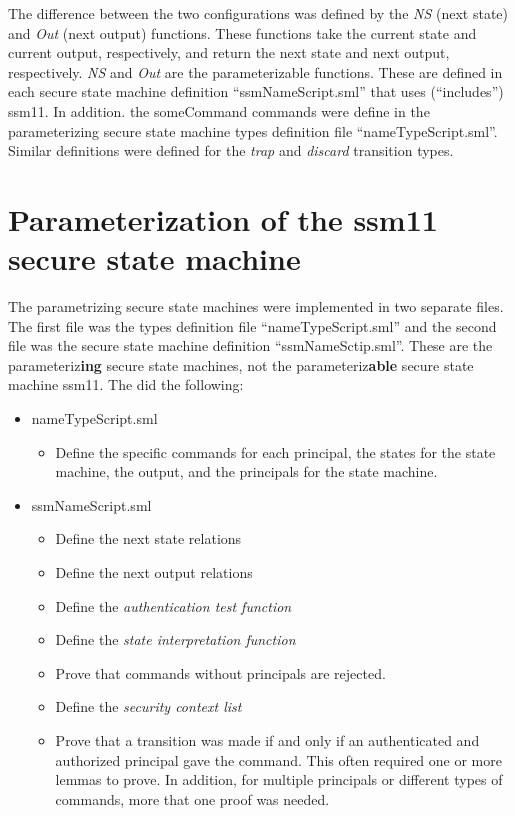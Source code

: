   The difference between the two configurations was defined by the \textit{NS} (next state) and \textit{Out} (next output)
  functions. These functions take the current state and current output, respectively, and return the
  next state and next output, respectively. \textit{NS} and \textit{Out} are the parameterizable functions. These are
  defined in each secure state machine definition “ssmNameScript.sml” that uses (“includes”) ssm11.
  In addition. the someCommand commands were define in the parameterizing secure state machine types
  definition file “nameTypeScript.sml”. Similar definitions were defined for the \textit{trap} and \textit{discard}
  transition types.
  

\section{Parameterization of the ssm11 secure state machine}
\label{sec:param-ssm11-secure}


The parametrizing secure state machines were implemented in two separate files. The first
file was the types definition file “nameTypeScript.sml” and the second file was the secure
state machine definition “ssmNameSctip.sml”. These are the parameteriz\textbf{ing} secure state machines,
not the parameteriz\textbf{able} secure state machine ssm11. The did the following:

\begin{itemize}
\item nameTypeScript.sml
  \begin{itemize}
  \item Define the specific commands for each principal, the states for the state machine,
    the output, and the principals for the state machine.
  \end{itemize}
\item ssmNameScript.sml
  \begin{itemize}
  \item Define the next state relations
  \item Define the next output relations
  \item Define the \textit{authentication test function}
  \item Define the \textit{state interpretation function}
  \item Prove that commands without principals are rejected.
  \item Define the \textit{security context list}
  \item Prove that a transition was made if and only if an authenticated and authorized
    principal gave the command. This often required one or more lemmas to prove. In addition,
    for multiple principals or different types of commands, more that one proof was needed.
    \end{itemize}
\end{itemize}

